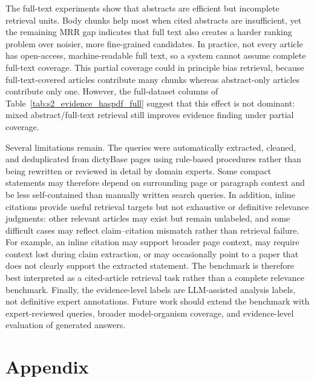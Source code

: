 \documentclass[runningheads]{llncs}
\begin{document}
The full-text experiments show that abstracts are efficient but incomplete
retrieval units. Body chunks help most when cited abstracts are insufficient, yet
the remaining MRR gap indicates that full text also creates a harder ranking
problem over noisier, more fine-grained candidates. In practice, not every article has open-access, machine-readable full text, so a
system cannot assume complete full-text coverage. This partial coverage could in
principle bias retrieval, because full-text-covered articles contribute many chunks
whereas abstract-only articles contribute only one. However, the full-dataset columns
of Table~\ref{tab:s2_evidence_haspdf_full} suggest that this effect is not dominant:
mixed abstract/full-text retrieval still improves evidence finding under partial
coverage.

Several limitations remain. The queries were automatically extracted, cleaned, and deduplicated from dictyBase pages using rule-based procedures rather than being rewritten or reviewed in detail by domain experts. Some compact statements may therefore depend on surrounding page or paragraph context and be less self-contained than manually written search queries. In addition, inline citations provide useful retrieval targets but not exhaustive or definitive relevance judgments: other relevant articles may exist but remain unlabeled, and some difficult cases may reflect claim--citation mismatch rather than retrieval failure. For example, an inline citation may support broader page context, may require context lost during claim extraction, or may occasionally point to a paper that does not clearly support the extracted statement. The benchmark is therefore best interpreted as a cited-article retrieval task rather than a complete relevance benchmark. Finally, the evidence-level labels are LLM-assisted analysis labels, not definitive expert annotations. Future work should extend the benchmark with expert-reviewed queries, broader model-organism coverage, and evidence-level evaluation of generated answers.

\FloatBarrier
\section*{Appendix}
\FloatBarrier
\setcounter{figure}{0}
\renewcommand{\thefigure}{S\arabic{figure}}
\renewcommand{\theHfigure}{S\arabic{figure}}
\setcounter{table}{0}
\renewcommand{\thetable}{S\arabic{table}}
\renewcommand{\theHtable}{S\arabic{table}}
\end{document}
